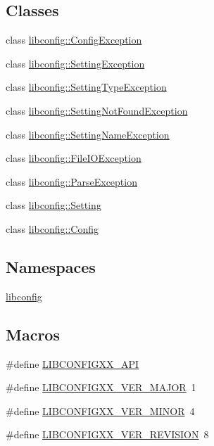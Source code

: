 \subsection*{Classes}
\begin{DoxyCompactItemize}
\item 
class \hyperlink{classlibconfig_1_1ConfigException}{libconfig\-::\-Config\-Exception}
\item 
class \hyperlink{classlibconfig_1_1SettingException}{libconfig\-::\-Setting\-Exception}
\item 
class \hyperlink{classlibconfig_1_1SettingTypeException}{libconfig\-::\-Setting\-Type\-Exception}
\item 
class \hyperlink{classlibconfig_1_1SettingNotFoundException}{libconfig\-::\-Setting\-Not\-Found\-Exception}
\item 
class \hyperlink{classlibconfig_1_1SettingNameException}{libconfig\-::\-Setting\-Name\-Exception}
\item 
class \hyperlink{classlibconfig_1_1FileIOException}{libconfig\-::\-File\-I\-O\-Exception}
\item 
class \hyperlink{classlibconfig_1_1ParseException}{libconfig\-::\-Parse\-Exception}
\item 
class \hyperlink{classlibconfig_1_1Setting}{libconfig\-::\-Setting}
\item 
class \hyperlink{classlibconfig_1_1Config}{libconfig\-::\-Config}
\end{DoxyCompactItemize}
\subsection*{Namespaces}
\begin{DoxyCompactItemize}
\item 
\hyperlink{namespacelibconfig}{libconfig}
\end{DoxyCompactItemize}
\subsection*{Macros}
\begin{DoxyCompactItemize}
\item 
\#define \hyperlink{libconfig_8h_09_09_a8664a5f8533ae4aecd48e7763f2a4839}{L\-I\-B\-C\-O\-N\-F\-I\-G\-X\-X\-\_\-\-A\-P\-I}
\item 
\#define \hyperlink{libconfig_8h_09_09_ab687fb0e058a7fcfc86a6a05f77dd545}{L\-I\-B\-C\-O\-N\-F\-I\-G\-X\-X\-\_\-\-V\-E\-R\-\_\-\-M\-A\-J\-O\-R}~1
\item 
\#define \hyperlink{libconfig_8h_09_09_a9a7835a0747b2ad8db8a3081a3c85f3c}{L\-I\-B\-C\-O\-N\-F\-I\-G\-X\-X\-\_\-\-V\-E\-R\-\_\-\-M\-I\-N\-O\-R}~4
\item 
\#define \hyperlink{libconfig_8h_09_09_a2e8b8ffb97a61e09a27ae2ec8686b50b}{L\-I\-B\-C\-O\-N\-F\-I\-G\-X\-X\-\_\-\-V\-E\-R\-\_\-\-R\-E\-V\-I\-S\-I\-O\-N}~8
\end{DoxyCompactItemize}


